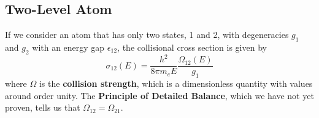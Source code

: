 \documentclass[10pt]{article}
\numberwithin{equation}{section}
\begin{document}
\subsection{Two-Level Atom} %
\label{sub:two_level_atom}
  If we consider an atom that has only two states, 1 and 2, with degeneracies
  $g_1$ and $g_2$ with an energy gap $\epsilon_{12}$, the collisional cross
  section is given by
  \begin{equation}
    \label{eq:coll:3} \sigma_{12}(E) = \frac{h^2}{8\pi m_e
    E}\frac{\Omega_{12}(E)}{g_1}
  \end{equation}
  where $\Omega$ is the \textbf{collision strength}, which is a dimensionless
  quantity with values around order unity. The \textbf{Principle of Detailed
  Balance}, which we have not yet proven, tells us that
  $\Omega_{12}=\Omega_{21}$.\\
  
\end{document}
